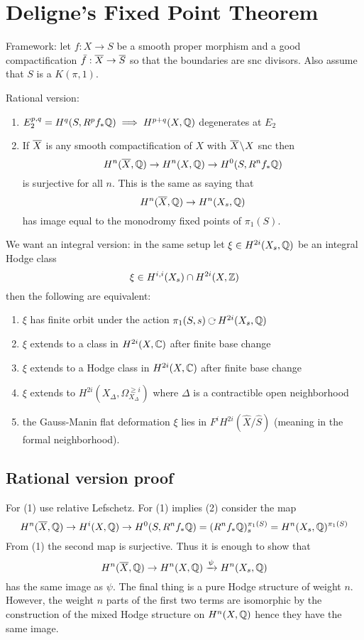 \documentclass[12pt]{article}
\begin{document}
\section{Deligne's Fixed Point Theorem}

Framework: let $f : X \to S$ be a smooth proper morphism and a good compactification $\bar{f} : \overline{X} \to \overline{S}$ so that the boundaries are snc divisors. Also assume that $S$ is a $K(\pi, 1)$. 


Rational version:
\begin{enumerate}
\item $E_2^{p,q} = H^q(S, R^p f_* \mathbb{Q}) \implies H^{p+q}(X, \mathbb{Q})$ degenerates at $E_2$
\item If $\overline{X}$ is any smooth compactification of $X$ with $\overline{X} \! \setminus \! X$ snc then
\[ H^n(\overline{X}, \mathbb{Q}) \to H^n(X, \mathbb{Q}) \to H^0(S, R^n f_* \mathbb{Q}) \]
is surjective for all $n$. 
This is the same as saying that
\[ H^n(\overline{X}, \mathbb{Q}) \to H^n(X_s, \mathbb{Q}) \]
has image equal to the monodromy fixed points of $\pi_1(S)$. 
\end{enumerate}

We want an integral version: in the same setup let $\xi \in H^{2i}(X_s, \mathbb{Q})$ be an integral Hodge class 
\[ \xi \in H^{i,i}(X_s) \cap H^{2i}(X, \mathbb{Z}) \]
then the following are equivalent:
\begin{enumerate}
\item $\xi$ has finite orbit under the action $\pi_1(S, s) \acts H^{2i}(X_s, \QQ)$

\item $\xi$ extends to a class in $H^{2i}(X, \mathbb{C})$ after finite base change

\item $\xi$ extends to a Hodge class in $H^{2i}(X, \mathbb{C})$ after finite base change

\item $\xi$ extends to $H^{2i}(X_\Delta, \Omega_{X_\Delta}^{\ge i})$ where $\Delta$ is a contractible open neighborhood

\item the Gauss-Manin flat deformation $\xi$ lies in $F^i H^{2i}(\hat{X} / \hat{S})$ (meaning in the formal neighborhood).  
\end{enumerate}


\subsection{Rational version proof}

For (1) use relative Lefschetz. For (1) implies (2) consider the map
\[ H^n(\overline{X}, \mathbb{Q}) \to H^i(X, \mathbb{Q}) \to H^0(S, R^n f_* \mathbb{Q}) = (R^n f_* \mathbb{Q})_s^{\pi_1(S)} = H^n(X_s, \mathbb{Q})^{\pi_1(S)} \]
From (1) the second map is surjective. Thus it is enough to show that
\[ H^n(\overline{X}, \mathbb{Q}) \to H^n(X, \mathbb{Q}) \xrightarrow{\psi} H^n(X_s, \mathbb{Q}) \]
has the same image as $\psi$. The final thing is a pure Hodge structure of weight $n$. However, the weight $n$ parts of the first two terms are isomorphic by the construction of the mixed Hodge structure on $H^n(X, \mathbb{Q})$ hence they have the same image.
\end{document}
